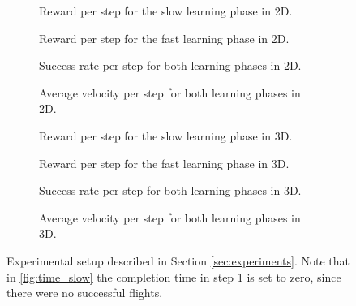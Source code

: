 \begin{figure*}[b]
    \centering
    \begin{subfigure}[htb!]{0.22\textwidth}
        
        \caption{Reward per step for the slow learning phase in 2D.}
        \label{fig:2D_reward_slow}
    \end{subfigure}
    \hfill    
    \begin{subfigure}[htb!]{0.22\textwidth}
        
        \caption{Reward per step for the fast learning phase in 2D.}
        \label{fig:2D_reward_fast}
    \end{subfigure}
    \hfill  
    \begin{subfigure}[htb!]{0.22\textwidth}
        
        \caption{Success rate per step for both learning phases in 2D.}
        \label{fig:2D_success_rate}
    \end{subfigure}
    \hfill  
    \begin{subfigure}[htb!]{0.22\textwidth}
        
        \caption{Average velocity per step for both learning phases in 2D.}
        \label{fig:2D_velocity}
    \end{subfigure}
    \hfill
    \begin{subfigure}[htb!]{0.22\textwidth}
        
        \caption{Reward per step for the slow learning phase in 3D.}
        \label{fig:3D_reward_slow}
    \end{subfigure}
    \hfill    
    \begin{subfigure}[htb!]{0.22\textwidth}
        
        \caption{Reward per step for the fast learning phase in 3D.}
        \label{fig:3D_reward_fast}
    \end{subfigure}
    \hfill  
    \begin{subfigure}[htb!]{0.22\textwidth}
        
        \caption{Success rate per step for both learning phases in 3D.}
        \label{fig:3D_success_rate}
    \end{subfigure}
    \hfill  
    \begin{subfigure}[htb!]{0.22\textwidth}
        
        \caption{Average velocity per step for both learning phases in 3D.}
        \label{fig:2D_velocity}
    \end{subfigure}
    
    \caption{Experimental setup described in Section \ref{sec:experiments}. Note that in \ref{fig:time_slow} the completion time in step 1 is set to zero, since there were no successful flights.}
    \label{fig:results}
\end{figure*}